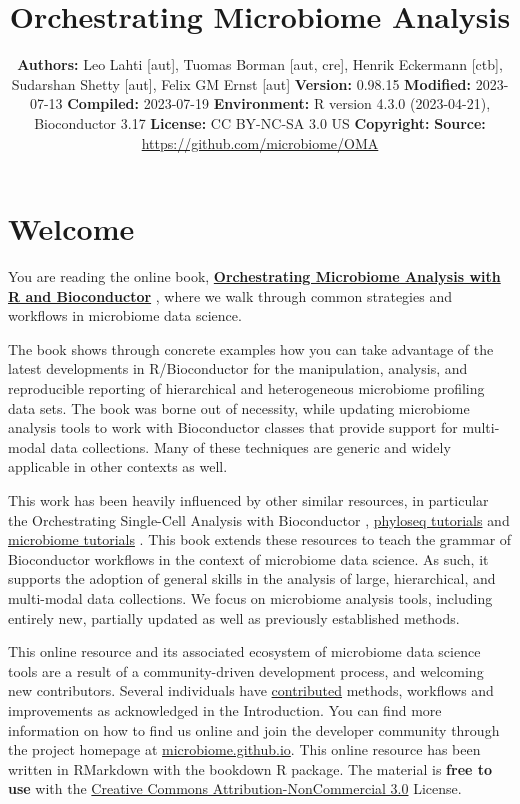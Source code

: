\documentclass[
]{book}
\title{Orchestrating Microbiome Analysis}
\author{}
\date{\vspace{-2.5em}\textbf{Authors:} Leo Lahti {[}aut{]}, Tuomas Borman {[}aut, cre{]}, Henrik Eckermann {[}ctb{]}, Sudarshan Shetty {[}aut{]}, Felix GM Ernst {[}aut{]} \textbf{Version:} 0.98.15 \textbf{Modified:} 2023-07-13 \textbf{Compiled:} 2023-07-19 \textbf{Environment:} R version 4.3.0 (2023-04-21), Bioconductor 3.17 \textbf{License:} CC BY-NC-SA 3.0 US \textbf{Copyright:} \textbf{Source:} \url{https://github.com/microbiome/OMA}}
\begin{document}
\maketitle

{
\setcounter{tocdepth}{1}
\tableofcontents
}
\hypertarget{welcome}{%
\chapter*{Welcome}\label{welcome}}

You are reading the online book, \href{https://microbiome.github.io/OMA/}{\textbf{Orchestrating Microbiome Analysis
with R and Bioconductor}} \citep{OMA}, where we
walk through common strategies and workflows in microbiome data
science.

The book shows through concrete examples how you can take advantage of
the latest developments in R/Bioconductor for the manipulation,
analysis, and reproducible reporting of hierarchical and heterogeneous
microbiome profiling data sets. The book was borne out of necessity,
while updating microbiome analysis tools to work with Bioconductor
classes that provide support for multi-modal data collections. Many of
these techniques are generic and widely applicable in other contexts
as well.

This work has been heavily influenced by other similar resources, in
particular the Orchestrating Single-Cell Analysis with Bioconductor
\citep{Amezquita2020}, \href{http://joey711.github.io/phyloseq/tutorials-index}{phyloseq
tutorials}
\citep{Callahan2016} and \href{https://microbiome.github.io/tutorials/}{microbiome
tutorials} \citep{Shetty2019}.
This book extends these resources to teach the grammar of Bioconductor
workflows in the context of microbiome data science. As such, it
supports the adoption of general skills in the analysis of large,
hierarchical, and multi-modal data collections. We focus on microbiome
analysis tools, including entirely new, partially updated as well as
previously established methods.

This online resource and its associated ecosystem of microbiome data
science tools are a result of a community-driven development process,
and welcoming new contributors. Several individuals have
\href{https://github.com/microbiome/OMA/graphs/contributors}{contributed}
methods, workflows and improvements as acknowledged in the
Introduction. You can find more information on how to find us online
and join the developer community through the project homepage at
\href{https://microbiome.github.io}{microbiome.github.io}. This online
resource has been written in RMarkdown with the bookdown R
package. The material is \textbf{free to use} with the \href{https://creativecommons.org/licenses/by-nc/3.0/us/}{Creative Commons
Attribution-NonCommercial
3.0} License.
\end{document}
